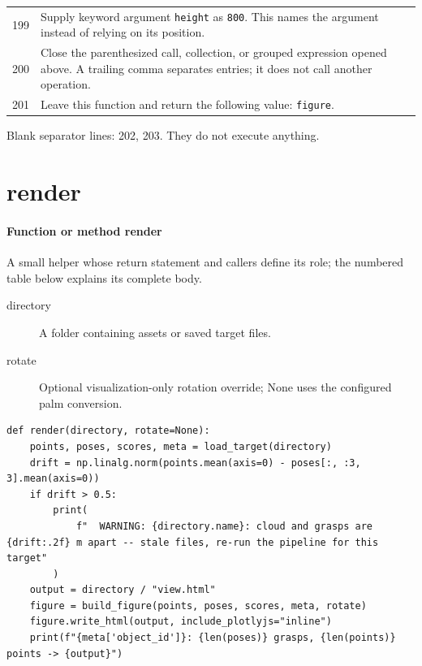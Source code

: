 \documentclass[11pt,a4paper]{book}
\begin{document}
\begin{longtable}{r p{}}
199 & Supply keyword argument \texttt{height} as \texttt{800}. This names the argument instead of relying on its position. \\

200 & Close the parenthesized call, collection, or grouped expression opened above. A trailing comma separates entries; it does not call another operation. \\

201 & Leave this function and return the following value: \texttt{figure}. \\

\end{longtable}

Blank separator lines: 202, 203. They do not execute anything.

\section{render}

\paragraph{Function or method render}
A small helper whose return statement and callers define its role; the numbered table below explains its complete body.

\begin{description}
\item[directory] A folder containing assets or saved target files.
\item[rotate] Optional visualization-only rotation override; None uses the configured palm conversion.
\end{description}

\begin{lstlisting}[firstnumber=204]
def render(directory, rotate=None):
    points, poses, scores, meta = load_target(directory)
    drift = np.linalg.norm(points.mean(axis=0) - poses[:, :3, 3].mean(axis=0))
    if drift > 0.5:
        print(
            f"  WARNING: {directory.name}: cloud and grasps are {drift:.2f} m apart -- stale files, re-run the pipeline for this target"
        )
    output = directory / "view.html"
    figure = build_figure(points, poses, scores, meta, rotate)
    figure.write_html(output, include_plotlyjs="inline")
    print(f"{meta['object_id']}: {len(poses)} grasps, {len(points)} points -> {output}")


\end{lstlisting}
\end{document}
